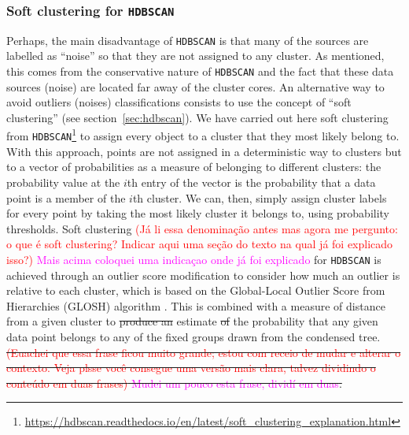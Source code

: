 \documentclass[fleqn,usenatbib]{mnras}
\newcommand{\comment}[1]{\textcolor{red}{#1}}
\newcommand{\luis}[1]{\textcolor{magenta}{#1}}
\begin{document}
\subsubsection{Soft clustering for \texttt{HDBSCAN}}

Perhaps, the main disadvantage of \texttt{HDBSCAN} is that many of the sources are labelled
as ``noise''
so that they are not assigned to any cluster. As mentioned,
this comes from the conservative nature of \texttt{HDBSCAN}
and the fact that these data sources (noise) are located far away of the cluster cores.
An alternative 
way
to avoid 
outliers (noises) classifications consists to use the concept 
of ``soft clustering'' (see section~\ref{sec:hdbscan}). We have carried out here soft
clustering 
from 
\texttt{HDBSCAN}\footnote{\url{https://hdbscan.readthedocs.io/en/latest/soft_clustering_explanation.html}} to assign every object to 
a cluster that they most likely belong to.
With this approach, points are not assigned in a deterministic way to clusters 
but to a vector of probabilities as a measure of belonging to different  clusters: the probability value at the $i$th entry of the vector
is the probability that a data point is a member of the $i$th cluster. 
We can, then, simply
assign cluster labels for every point by taking the most likely cluster it belongs to,
using probability thresholds. Soft clustering
\comment{(Já li essa denominação antes mas agora me pergunto: o que é soft clustering? Indicar aqui uma seção do texto na qual já foi explicado isso?)} \luis{Mais acima coloquei uma indicaçao onde já foi explicado}
for \texttt{HDBSCAN} is achieved through an outlier score modification to 
consider how much an outlier is relative to each cluster, which is based on the
Global-Local Outlier Score from Hierarchies (GLOSH) algorithm \citep{Campello:2015}.
This is combined with a measure of distance from a given cluster to \sout{produce an} estimate \sout{of} the probability that any given data point belongs to any of the fixed groups drawn from the condensed tree. \sout{\comment{(Euachei que essa frase ficou muito grande; estou com receio de mudar e alterar o contexto. Veja plsse você consegue uma versão mais clara, talvez dividindo o conteúdo em duas frases)} \luis{Mudei um pouco esta frase, dividí em duas}.}
\end{document}

